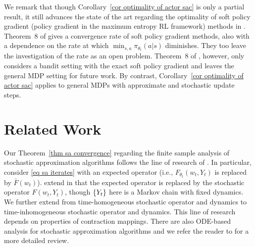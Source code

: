 \documentclass[twoside,11pt]{article}
\numberwithin{assucounter}{section}
\begin{document}
We remark that though Corollary~\ref{cor optimality of actor sac} is only a partial result,
it still advances the state of the art regarding the optimality of soft policy gradient (policy gradient in the maximum entropy RL framework) methods in \citet{mei2020global}.
Theorem~8 of \citet{mei2020global} gives a convergence rate of soft policy gradient methods,
also with a dependence on the rate at which $\min_{s, a}\pi_{\theta_t}(a|s)$ diminishes. They too leave the investigation of the rate as an open problem.
Theorem~8 of \citet{mei2020global}, however,
only considers a bandit setting with the exact soft policy gradient and leaves the general MDP setting for future work.
By contrast,
Corollary~\ref{cor optimality of actor sac} applies to general MDPs with approximate and stochastic update steps.

\section{Related Work}
Our Theorem~\ref{thm sa convergence} regarding the finite sample analysis of stochastic approximation algorithms follows the line of research of \citet{chen2020finite,chen2021lyapunov}.
In particular,
\citet{chen2020finite} consider \eqref{eq sa iterates} 
with an expected operator (i.e., $F_{\theta_t}(w_t, Y_t)$ is replaced by $\bar F(w_t)$).
\citet{chen2021lyapunov} extend \citet{chen2020finite} in that the expected operator is replaced by the stochastic operator $F(w_t, Y_t)$,
though $\qty{Y_t}$ here is a Markov chain with fixed dynamics.
We further extend \citet{chen2021lyapunov} from time-homogeneous stochastic operator and dynamics to time-inhomogeneous stochastic operator and dynamics.
This line of research depends on properties of contraction mappings.
There are also ODE-based analysis for stochastic approximation algorithms \citep{DBLP:books/sp/BenvenisteMP90,kushner2003stochastic,borkar2009stochastic} 
and we refer the reader to \citet{chen2020finite,chen2021lyapunov} for a more detailed review.
\end{document}
